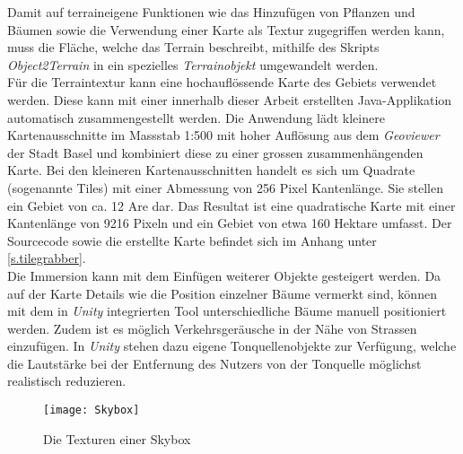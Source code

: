 Damit auf terraineigene Funktionen wie das Hinzufügen von Pflanzen und Bäumen sowie die Verwendung einer Karte als Textur zugegriffen werden kann, muss die Fläche, welche das Terrain beschreibt, mithilfe des Skripts \textit{Object2Terrain}\cite{website:terrain} in ein spezielles \textit{Terrainobjekt} umgewandelt werden.\\[6pt]
Für die Terraintextur kann eine hochauflössende Karte des Gebiets verwendet werden. Diese kann mit einer innerhalb dieser Arbeit erstellten Java-Applikation automatisch zusammengestellt werden. Die Anwendung lädt kleinere Kartenausschnitte im Massstab 1:500 mit hoher Auflösung aus dem \textit{Geoviewer} der Stadt Basel und kombiniert diese zu einer grossen zusammenhängenden Karte. Bei den kleineren Kartenausschnitten handelt es sich um Quadrate (sogenannte Tiles) mit einer Abmessung von 256 Pixel Kantenlänge. Sie stellen ein Gebiet von ca. 12 Are dar. Das Resultat ist eine quadratische Karte mit einer Kantenlänge von 9216 Pixeln und ein Gebiet von etwa 160 Hektare umfasst. Der Sourcecode sowie die erstellte Karte befindet sich im Anhang unter \ref{s.tilegrabber}.\\[6pt]
Die Immersion kann mit dem Einfügen weiterer Objekte gesteigert werden. Da auf der Karte Details wie die Position einzelner Bäume vermerkt sind, können mit dem in \textit{Unity} integrierten Tool unterschiedliche Bäume manuell positioniert werden. Zudem ist es möglich Verkehrsgeräusche in der Nähe von Strassen einzufügen. In \textit{Unity} stehen dazu eigene Tonquellenobjekte zur Verfügung, welche die Lautstärke bei der Entfernung des Nutzers von der Tonquelle möglichst realistisch reduzieren.\\[6pt]
\vspace{-12pt}
\begin{wrapfigure}{r}{0.35\textwidth}
	\vspace{-30pt}
	\begin{center}
		\texttt{[image: Skybox]}
	\end{center}
	\vspace{-15pt}
	\captionsetup{width=0.28\textwidth}
	\caption{Die Texturen einer Skybox}
	\vspace{-20pt}
\end{wrapfigure}
